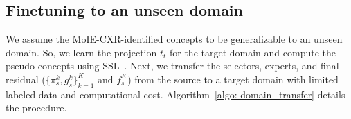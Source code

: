 \subsection{Finetuning to an unseen domain} 
We assume the MoIE-CXR-identified concepts to be generalizable to an unseen domain. So, we learn the projection $t_t$ for the target domain and compute the pseudo concepts using SSL~\cite{lee2013pseudo}. Next, we transfer the selectors, experts, and final residual ($\{\pi^k_s, g^k_s\}_{k=1}^K$ and $f^K_s$) from the source to a target domain with limited labeled data and computational cost.
Algorithm~\ref{algo: domain_transfer} details the procedure.

